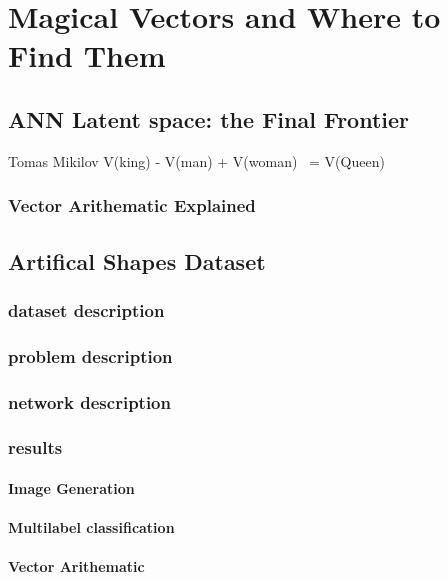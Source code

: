 
\chapter{Magical Vectors and Where to Find Them} %

\label{Chapter5} %


\section{ANN Latent space: the Final Frontier}
Tomas Mikilov V(king) - V(man) + V(woman) ~= V(Queen)
\subsection{Vector Arithematic Explained}

\section{Artifical Shapes Dataset}
\subsection{dataset description}
\subsection{problem description}
\subsection{network description}
\subsection{results}

\subsubsection{Image Generation}
\subsubsection{Multilabel classification}
\subsubsection{Vector Arithematic}


